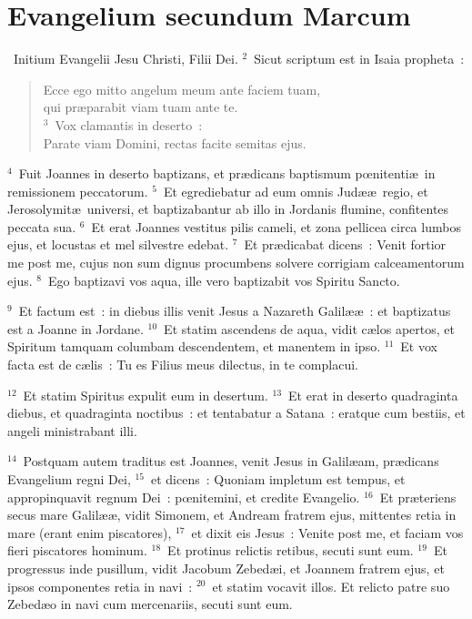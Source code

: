 \clearpage
{\centering \section*{Evangelium secundum Marcum}}\thispagestyle{empty}

~Initium Evangelii Jesu Christi, Filii Dei.
${}^{2}$~Sicut scriptum est in Isaia propheta~: \begin{flushleft}\begin{verse}Ecce ego mitto angelum meum ante faciem tuam,\\ qui pr\ae parabit viam tuam ante te.\\
${}^{3}$~Vox clamantis in deserto~:\\ Parate viam Domini, rectas facite semitas ejus.\end{verse}\end{flushleft}


${}^{4}$~Fuit Joannes in deserto baptizans, et pr\ae dicans baptismum pœnitenti\ae\ in remissionem peccatorum.
${}^{5}$~Et egrediebatur ad eum omnis Jud\ae \ae\ regio, et Jerosolymit\ae\ universi, et baptizabantur ab illo in Jordanis flumine, confitentes peccata sua.
${}^{6}$~Et erat Joannes vestitus pilis cameli, et zona pellicea circa lumbos ejus, et locustas et mel silvestre edebat.
${}^{7}$~Et pr\ae dicabat dicens~: Venit fortior me post me, cujus non sum dignus procumbens solvere corrigiam calceamentorum ejus.
${}^{8}$~Ego baptizavi vos aqua, ille vero baptizabit vos Spiritu Sancto.


${}^{9}$~Et factum est~: in diebus illis venit Jesus a Nazareth Galil\ae \ae~: et baptizatus est a Joanne in Jordane.
${}^{10}$~Et statim ascendens de aqua, vidit c\ae los apertos, et Spiritum tamquam columbam descendentem, et manentem in ipso.
${}^{11}$~Et vox facta est de c\ae lis~: Tu es Filius meus dilectus, in te complacui.


${}^{12}$~Et statim Spiritus expulit eum in desertum.
${}^{13}$~Et erat in deserto quadraginta diebus, et quadraginta noctibus~: et tentabatur a Satana~: eratque cum bestiis, et angeli ministrabant illi.


${}^{14}$~Postquam autem traditus est Joannes, venit Jesus in Galil\ae am, pr\ae dicans Evangelium regni Dei,
${}^{15}$~et dicens~: Quoniam impletum est tempus, et appropinquavit regnum Dei~: pœnitemini, et credite Evangelio.
${}^{16}$~Et pr\ae teriens secus mare Galil\ae \ae , vidit Simonem, et Andream fratrem ejus, mittentes retia in mare (erant enim piscatores),
${}^{17}$~et dixit eis Jesus~: Venite post me, et faciam vos fieri piscatores hominum.
${}^{18}$~Et protinus relictis retibus, secuti sunt eum.
${}^{19}$~Et progressus inde pusillum, vidit Jacobum Zebed\ae i, et Joannem fratrem ejus, et ipsos componentes retia in navi~:
${}^{20}$~et statim vocavit illos. Et relicto patre suo Zebed\ae o in navi cum mercenariis, secuti sunt eum.



